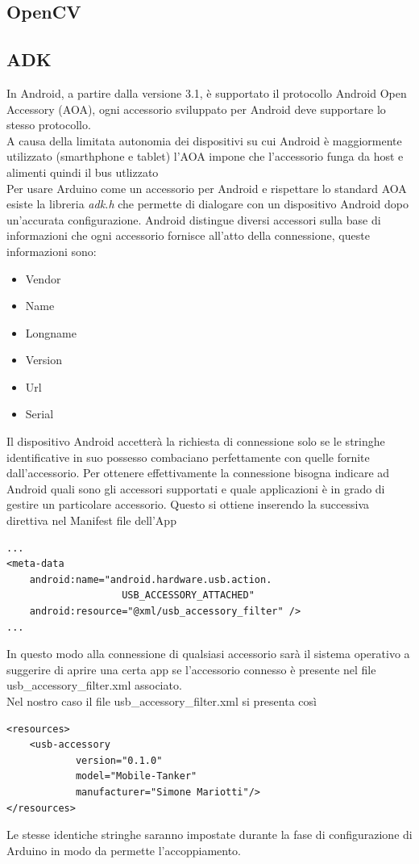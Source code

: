 \subsection {OpenCV}
\subsection {ADK}
In Android, a partire dalla versione 3.1, è supportato il protocollo Android Open 
Accessory (AOA), 
ogni accessorio sviluppato per Android deve supportare lo stesso protocollo. 
\\A causa della limitata autonomia dei dispositivi su cui Android è maggiormente 
utilizzato (smarthphone e tablet) l'AOA impone che l'accessorio funga da host 
e alimenti quindi il bus utlizzato
\\Per usare Arduino come un accessorio per Android e rispettare lo standard AOA 
esiste la libreria \textit{adk.h} che permette di dialogare con un dispositivo 
Android dopo un'accurata configurazione. Android distingue diversi accessori 
sulla base di informazioni che ogni accessorio fornisce all'atto della connessione, 
queste informazioni sono:
\begin{itemize}
\item Vendor
\item Name
\item Longname
\item Version
\item Url
\item Serial
\end{itemize} 
Il dispositivo Android accetterà la richiesta di connessione solo se le stringhe 
identificative in suo possesso combaciano perfettamente con quelle fornite 
dall'accessorio. Per ottenere effettivamente la connessione bisogna indicare ad 
Android quali sono gli accessori supportati e quale applicazioni è in grado di 
gestire un particolare accessorio. Questo si ottiene inserendo la successiva 
direttiva nel Manifest file dell'App

\lstset{language=XML}

\begin{lstlisting}[caption=Porzione del Manifest file dell'App]
...
<meta-data
    android:name="android.hardware.usb.action.
    				USB_ACCESSORY_ATTACHED"
    android:resource="@xml/usb_accessory_filter" />
...
\end{lstlisting}
In questo modo alla connessione di qualsiasi accessorio sarà il sistema operativo
a suggerire di aprire una certa app se l'accessorio connesso è presente nel file 
usb\_accessory\_filter.xml associato.
\\Nel nostro caso il file usb\_accessory\_filter.xml si presenta così
\begin{lstlisting}[caption=usb\_accessory\_filter.xml]
<resources>
    <usb-accessory
            version="0.1.0"
            model="Mobile-Tanker"
            manufacturer="Simone Mariotti"/>
</resources>
\end{lstlisting}
Le stesse identiche stringhe saranno impostate durante la fase di configurazione 
di Arduino in modo da permette l'accoppiamento.
